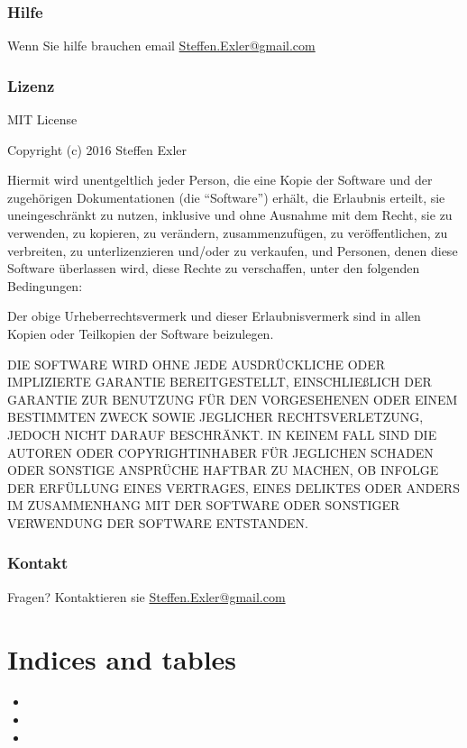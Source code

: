 \documentclass[letterpaper,10pt,ngerman]{sphinxmanual}
\begin{document}
\subsection{Hilfe}
\label{help::doc}\label{help:hilfe}
Wenn Sie hilfe brauchen email \href{mailto:Steffen.Exler@gmail.com}{Steffen.Exler@gmail.com}


\subsection{Lizenz}
\label{license:lizenz}\label{license::doc}
MIT License

Copyright (c) 2016 Steffen Exler

Hiermit wird unentgeltlich jeder Person, die eine Kopie der Software und der zugehörigen Dokumentationen (die ``Software'') erhält, die Erlaubnis erteilt, sie uneingeschränkt zu nutzen, inklusive und ohne Ausnahme mit dem Recht, sie zu verwenden, zu kopieren, zu verändern, zusammenzufügen, zu veröffentlichen, zu verbreiten, zu unterlizenzieren und/oder zu verkaufen, und Personen, denen diese Software überlassen wird, diese Rechte zu verschaffen, unter den folgenden Bedingungen:

Der obige Urheberrechtsvermerk und dieser Erlaubnisvermerk sind in allen Kopien oder Teilkopien der Software beizulegen.

DIE SOFTWARE WIRD OHNE JEDE AUSDRÜCKLICHE ODER IMPLIZIERTE GARANTIE BEREITGESTELLT, EINSCHLIEßLICH DER GARANTIE ZUR BENUTZUNG FÜR DEN VORGESEHENEN ODER EINEM BESTIMMTEN ZWECK SOWIE JEGLICHER RECHTSVERLETZUNG, JEDOCH NICHT DARAUF BESCHRÄNKT. IN KEINEM FALL SIND DIE AUTOREN ODER COPYRIGHTINHABER FÜR JEGLICHEN SCHADEN ODER SONSTIGE ANSPRÜCHE HAFTBAR ZU MACHEN, OB INFOLGE DER ERFÜLLUNG EINES VERTRAGES, EINES DELIKTES ODER ANDERS IM ZUSAMMENHANG MIT DER SOFTWARE ODER SONSTIGER VERWENDUNG DER SOFTWARE ENTSTANDEN.


\subsection{Kontakt}
\label{license:kontakt}
Fragen? Kontaktieren sie \href{mailto:Steffen.Exler@gmail.com}{Steffen.Exler@gmail.com}


\chapter{Indices and tables}
\label{index:indices-and-tables}\begin{itemize}
\item {} 

\item {} 

\item {} 

\end{itemize}



\renewcommand{\indexname}{Stichwortverzeichnis}
\printindex
\end{document}
